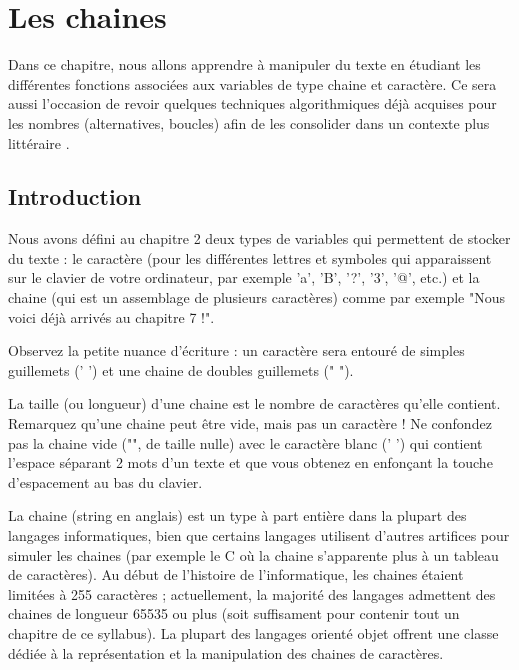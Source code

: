 \chapter{Les chaines}

	Dans ce chapitre, 
	nous allons apprendre à manipuler du texte 
	en étudiant les différentes fonctions associées 
	aux variables de type chaine et caractère. 
	Ce sera aussi l'occasion de revoir quelques techniques algorithmiques 
	déjà acquises pour les nombres (alternatives, boucles) 
	afin de les consolider dans un contexte plus \og littéraire \fg.
	
\section{Introduction}

	Nous avons défini au chapitre 2 deux types de variables 
	qui permettent de stocker du texte : 
	le caractère 
	(pour les différentes lettres et symboles 
	qui apparaissent sur le clavier de votre ordinateur, 
	par exemple 'a', 'B', '?', '3', '@', etc.) 
	et la chaine (qui est un assemblage de plusieurs caractères) 
	comme par exemple "Nous voici déjà arrivés au chapitre 7 !".

	Observez la petite nuance d'écriture :
	un caractère sera entouré de simples guillemets (' ') 
	et une chaine de doubles guillemets (" ").

	La taille (ou longueur) d'une chaine 
	est le nombre de caractères qu'elle contient. 
	Remarquez qu'une chaine peut être vide, mais pas un caractère !
	Ne confondez pas la chaine vide ("", de taille nulle) 
	avec le caractère blanc (' ') qui contient l'espace séparant 
	2 mots d'un texte et que vous obtenez en enfonçant 
	la touche d'espacement au bas du clavier.

	La chaine (string en anglais) 
	est un type à part entière dans la plupart des langages informatiques, 
	bien que certains langages utilisent d'autres artifices 
	pour simuler les chaines 
	(par exemple le C où la chaine s'apparente plus 
	à un tableau de caractères). 
	Au début de l'histoire de l'informatique, 
	les chaines étaient limitées à 255 caractères ;
	actuellement, la majorité des langages admettent des chaines 
	de longueur 65535 ou plus 
	(soit suffisament pour contenir tout un chapitre de ce syllabus). 
	La plupart des langages orienté objet offrent une classe 
	dédiée à la représentation et la manipulation des chaines de caractères.

